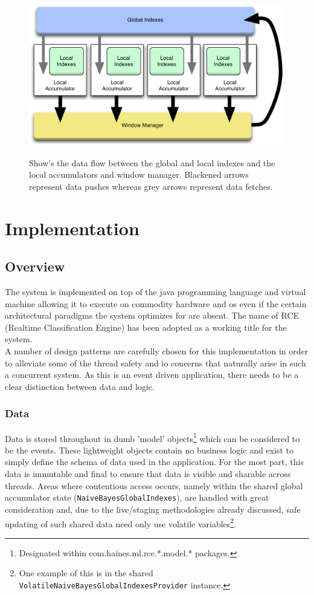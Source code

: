 \documentclass[a4paper,11pt]{scrreprt}
\begin{document}
\begin{figure}[h!]
\centering
\caption{Show's the data flow between the global and local indexes and the local accumulators and window manager. Blackened arrows represent data pushes whereas grey arrows represent data fetches.}
\includegraphics[scale=0.35, trim=0 0 0 12, clip=true] {indexes.pdf}
\label{fig:indexes}
\end{figure}

\chapter{Implementation}
\VerbatimFootnotes
\section{Overview}
The system is implemented on top of the java programming language and virtual machine allowing it to execute on commodity hardware and \acrshort{os} even if the certain architectural paradigms the system optimizes for are absent. The name of RCE (Realtime Classification Engine) has been adopted as a working title for the system. \\A number of design patterns are carefully chosen for this implementation in order to alleviate some of the thread safety and \acrshort{io} concerns that naturally arise in such a concurrent system. As this is an event driven application, there needs to be a clear distinction between data and logic. 
\subsection{Data}
Data is stored throughout in dumb 'model' objects\footnote{Designated within com.haines.ml.rce.*.model.* packages.} which can be considered to be the events. These lightweight objects contain no business logic and exist to simply define the schema of data used in the application. For the most part, this data is immutable and final to ensure that data is visible and sharable across threads. Areas where contentious access occurs, namely within the shared global accumulator state (\verb|NaiveBayesGlobalIndexes|), are handled with great consideration and, due to the live/staging methodologies already discussed, safe updating of such shared data need only use volatile variables\footnote{One example of this is in the shared \verb|VolatileNaiveBayesGlobalIndexesProvider| instance.}. 
\end{document}
